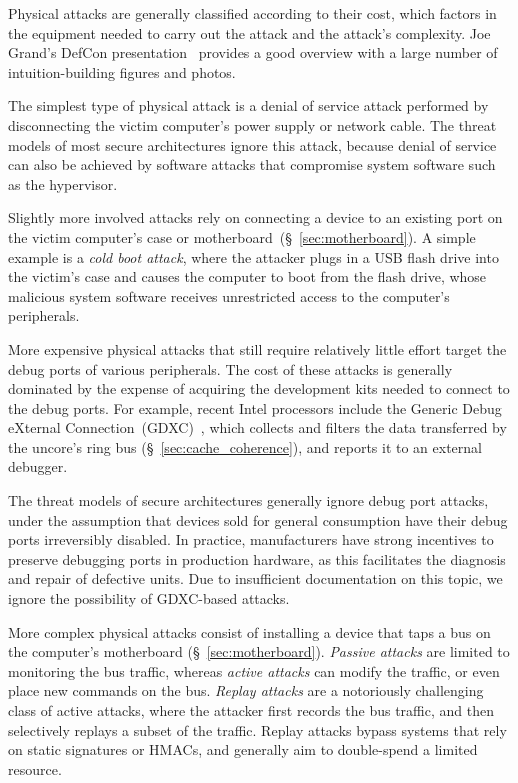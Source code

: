 \label{sec:physical_attacks}

Physical attacks are generally classified according to their cost, which
factors in the equipment needed to carry out the attack and the attack's
complexity. Joe Grand's DefCon presentation~\cite{grand2004physicalattacks}
provides a good overview with a large number of intuition-building figures and
photos.

The simplest type of physical attack is a denial of service attack performed by
disconnecting the victim computer's power supply or network cable. The threat
models of most secure architectures ignore this attack, because denial of
service can also be achieved by software attacks that compromise system
software such as the hypervisor.


\label{sec:physical_port_attacks}

Slightly more involved attacks rely on connecting a device to an existing port
on the victim computer's case or motherboard~(\S~\ref{sec:motherboard}). A
simple example is a \textit{cold boot attack}, where the attacker plugs in a
USB flash drive into the victim's case and causes the computer to boot from
the flash drive, whose malicious system software receives unrestricted access
to the computer's peripherals.

More expensive physical attacks that still require relatively little effort
target the debug ports of various peripherals. The cost of these attacks is
generally dominated by the expense of acquiring the development kits needed to
connect to the debug ports. For example, recent Intel processors include the
Generic Debug eXternal Connection~(GDXC)~\cite{yuffe2011sandybridge,
intel2011gdxc}, which collects and filters the data transferred by the uncore's
ring bus (\S~\ref{sec:cache_coherence}), and reports it to an external
debugger.

The threat models of secure architectures generally ignore debug port attacks,
under the assumption that devices sold for general consumption have their debug
ports irreversibly disabled. In practice, manufacturers have strong incentives
to preserve debugging ports in production hardware, as this facilitates the
diagnosis and repair of defective units. Due to insufficient documentation on
this topic, we ignore the possibility of GDXC-based attacks.


\label{sec:physical_bus_attacks}

More complex physical attacks consist of installing a device that taps a bus on
the computer's motherboard (\S~\ref{sec:motherboard}). \textit{Passive attacks}
are limited to monitoring the bus traffic, whereas \textit{active attacks} can
modify the traffic, or even place new commands on the bus. \textit{Replay
attacks} are a notoriously challenging class of active attacks, where
the attacker first records the bus traffic, and then selectively replays a
subset of the traffic. Replay attacks bypass systems that rely on static
signatures or HMACs, and generally aim to double-spend a limited resource.

